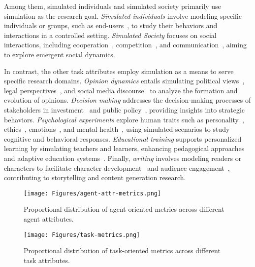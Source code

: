 Among them, simulated individuals and simulated society primarily use simulation as the research goal. 
\textit{Simulated individuals} involve modeling specific individuals or groups, such as end-users~\cite{chen2024seeing}, to study their behaviors and interactions in a controlled setting. 
\textit{Simulated Society} focuses on social interactions, including cooperation~\cite{bouzekri2024chatgpt}, competition~\cite{wu2024shall}, and communication~\cite{mishra-etal-2023-e}, aiming to explore emergent social dynamics.

In contrast, the other task attributes employ simulation as a means to serve specific research domains. 
\textit{Opinion dynamics} entails simulating political views~\cite{neuberger2024sauce}, legal perspectives~\cite{chen2024agentcourt}, and social media discourse~\cite{liu2024tiny} to analyze the formation and evolution of opinions. \textit{Decision making} addresses the decision-making processes of stakeholders in investment~\cite{sreedhar2024simulating} and public policy~\cite{ji2024srap}, providing insights into strategic behaviors. \textit{Psychological experiments} explore human traits such as personality~\cite{bose2024assessing}, ethics~\cite{lei2024fairmindsim}, emotions~\cite{zhao2024esc}, and mental health~\cite{de2025introducing}, using simulated scenarios to study cognitive and behavioral responses. 
\textit{Educational training} supports personalized learning by simulating teachers and learners, enhancing pedagogical approaches and adaptive education systems~\cite{Liu2024PersonalityawareSS}. Finally, \textit{writing} involves modeling readers or characters to facilitate character development~\cite{10.1145/3613904.3642406} and audience engagement~\cite{choi2024proxona}, contributing to storytelling and content generation research.

\begin{figure*}[t]
    \centering
    \texttt{[image: Figures/agent-attr-metrics.png]}
    \caption{Proportional distribution of agent-oriented metrics across different agent attributes.}
    \label{fig:pie-chart-agent-oriented}
\end{figure*}


\begin{figure*}
    \centering
    \texttt{[image: Figures/task-metrics.png]}
    \caption{Proportional distribution of task-oriented metrics across different task attributes.}
    \label{fig:pie-chart-task-oriented}
\end{figure*}



